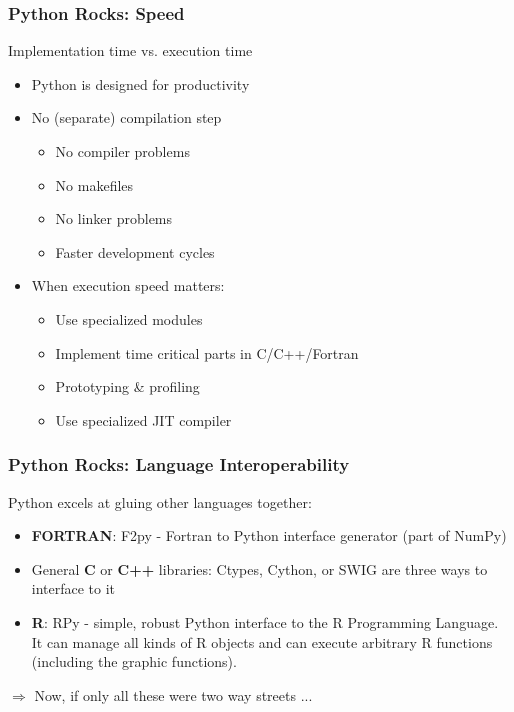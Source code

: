\documentclass[t,10pt,compress=false,usepdftitle=false]{beamer}
\begin{document}
\begin{frame}[fragile]
    \frametitle{Python Rocks: Speed}
    Implementation time vs. execution time
    \pause
     \begin{itemize}
    	\item Python is designed for productivity
    	\pause
    	\item No (separate) compilation step
        \begin{itemize}
	    \item No compiler problems
	    \item No makefiles
	    \item No linker problems
	    \item Faster development cycles
        \end{itemize}	    
    	\pause
    	\item When execution speed matters:
        \begin{itemize}
    	    \item Use specialized modules
    	    \item Implement time critical parts in C/C++/Fortran
      	    \item Prototyping \& profiling
      	    \item Use specialized JIT compiler
        \end{itemize}
    \end{itemize}
\end{frame}

\begin{frame}[fragile]
    \frametitle{Python Rocks: Language Interoperability}
    Python excels at gluing other languages together: 
     \begin{itemize}
       \item \textbf{FORTRAN}: F2py - Fortran to Python interface generator (part of NumPy)
       \pause
       \item General \textbf{C} or \textbf{C++} libraries: Ctypes, Cython, or SWIG are three ways to interface to it
       \pause
       \item \textbf{R}: RPy - simple, robust Python interface to the R Programming Language. It can manage all kinds of R objects and can execute arbitrary R functions (including the graphic functions).
    \end{itemize}
    \pause
    $\Longrightarrow$ Now, if only all these were two way streets ...
\end{frame}
\end{document}
